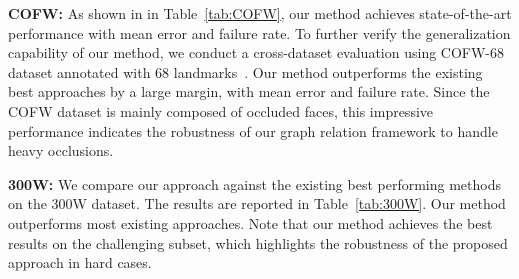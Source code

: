 \documentclass[runningheads]{llncs}
\begin{document}
\textbf{COFW:}
As shown in in Table~\ref{tab:COFW}, our method achieves state-of-the-art performance with  mean error and  failure rate.
To further verify the generalization capability of our method, we conduct a cross-dataset evaluation using COFW-68 dataset annotated with 68 landmarks~\cite{HPM}.
Our method outperforms the existing best approaches by a large margin, with  mean error and  failure rate.
Since the COFW dataset is mainly composed of occluded faces, this impressive performance indicates the robustness of our graph relation framework to handle heavy occlusions.






\textbf{300W:}
We compare our approach against the existing best performing methods on the 300W dataset.
The results are reported in Table~\ref{tab:300W}.
Our method outperforms most existing approaches.
Note that our method achieves the best results on the challenging subset, which highlights the robustness of the proposed approach in hard cases.
\end{document}
